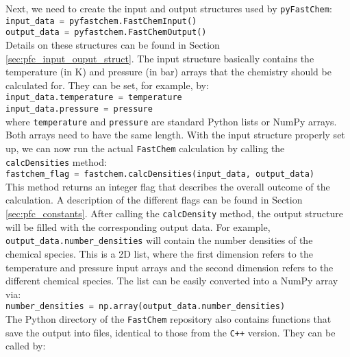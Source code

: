\documentclass[numbers=noenddot]{aux/fcmanual}
\newcommand{\fc}{\texttt{FastChem}\xspace}
\newcommand{\pfc}{\texttt{pyFastChem}\xspace}
\newcommand{\cpp}{\ttt{C++}\xspace}
\newcommand{\ttt}[1]{\texttt {#1}}
\begin{document}
Next, we need to create the input and output structures used by \pfc:\\

\lstinline[language=Python]!input_data = pyfastchem.FastChemInput()!\\
\lstinline[language=Python]!output_data = pyfastchem.FastChemOutput()!\\

Details on these structures can be found in Section \ref{sec:pfc_input_ouput_struct}. The input structure basically contains the temperature (in K) and pressure (in bar) arrays that the chemistry should be calculated for. They can be set, for example, by:\\

\lstinline[language=Python]!input_data.temperature = temperature!\\
\lstinline[language=Python]!input_data.pressure = pressure!\\

where \lstinline[language=Python]!temperature! and \lstinline[language=Python]!pressure! are standard Python lists or NumPy arrays. Both arrays need to have the same length.
With the input structure properly set up, we can now run the actual \fc calculation by calling the \lstinline[language=Python]!calcDensities! method:\\

\lstinline[language=Python]!fastchem_flag = fastchem.calcDensities(input_data, output_data)!\\

This method returns an integer flag that describes the overall outcome of the calculation. A description of the different flags can be found in Section \ref{sec:pfc_constants}. After calling the \lstinline[language=Python]!calcDensity! method, the output structure will be filled with the corresponding output data. For example, \\
\lstinline[language=Python]!output_data.number_densities!
will contain the number densities of the chemical species. This is a 2D list, where the first dimension refers to the temperature and pressure input arrays and the second dimension refers to the different chemical species. The list can be easily converted into a NumPy array via:\\

\lstinline[language=Python]!number_densities = np.array(output_data.number_densities)!\\

The Python directory of the \fc repository also contains functions that save the output into files, identical to those from the \cpp version. They can be called by:\\
\end{document}
